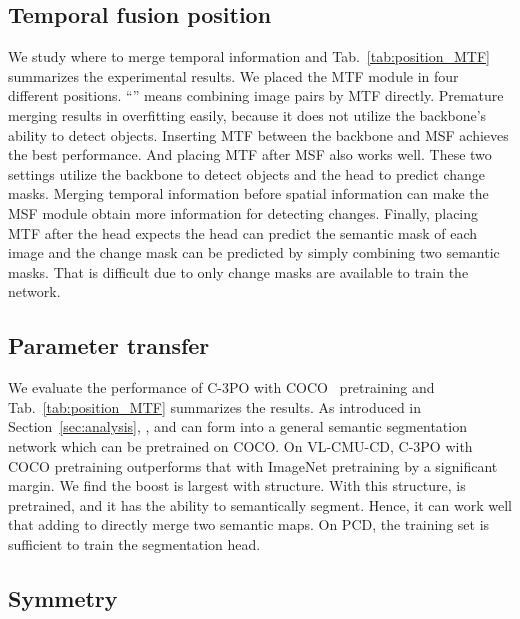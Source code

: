\documentclass[review]{elsarticle}
\begin{document}
\subsection{Temporal fusion position}

We study where to merge temporal information and Tab.~\ref{tab:position_MTF} summarizes the experimental results. We placed the MTF module in four different positions. ``'' means combining image pairs by MTF directly. Premature merging results in overfitting easily, because it does not utilize the backbone's ability to detect objects. Inserting MTF between the backbone and MSF achieves the best performance. And placing MTF after MSF also works well. These two settings utilize the backbone to detect objects and the head to predict change masks. Merging temporal information before spatial information can make the MSF module obtain more information for detecting changes. Finally, placing MTF after the head expects the head can predict the semantic mask of each image and the change mask can be predicted by simply combining two semantic masks. That is difficult due to only change masks are available to train the network.

\subsection{Parameter transfer}
\label{sec:transfer}

We evaluate the performance of C-3PO with COCO~\cite{COCO} pretraining and Tab.~\ref{tab:position_MTF} summarizes the results. As introduced in Section~\ref{sec:analysis}, ,  and  can form into a general semantic segmentation network which can be pretrained on COCO. On VL-CMU-CD, C-3PO with COCO pretraining outperforms that with ImageNet pretraining by a significant margin. We find the boost is largest with  structure. With this structure,  is pretrained, and it has the ability to semantically segment. Hence, it can work well that adding  to directly merge two semantic maps. On PCD, the training set is sufficient to train the segmentation head.  

\subsection{Symmetry}
\label{sec:symmetry}
\end{document}
